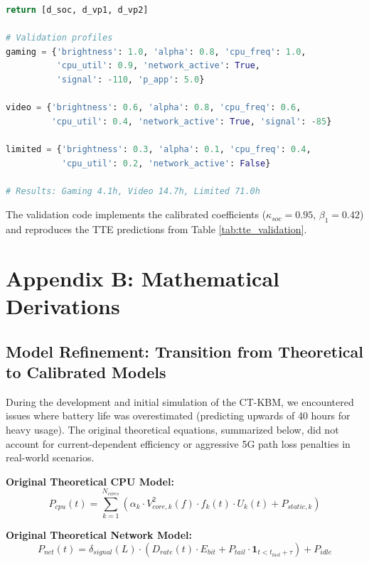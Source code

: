\documentclass[12pt]{article}
\begin{document}
\begin{lstlisting}[language=Python, caption={Validation with updated equations}]
    return [d_soc, d_vp1, d_vp2]

# Validation profiles
gaming = {'brightness': 1.0, 'alpha': 0.8, 'cpu_freq': 1.0,
          'cpu_util': 0.9, 'network_active': True,
          'signal': -110, 'p_app': 5.0}

video = {'brightness': 0.6, 'alpha': 0.8, 'cpu_freq': 0.6,
         'cpu_util': 0.4, 'network_active': True, 'signal': -85}

limited = {'brightness': 0.3, 'alpha': 0.1, 'cpu_freq': 0.4,
           'cpu_util': 0.2, 'network_active': False}

# Results: Gaming 4.1h, Video 14.7h, Limited 71.0h
\end{lstlisting}

The validation code implements the calibrated coefficients ($\kappa_{soc} = 0.95$, $\beta_1 = 0.42$) and reproduces the TTE predictions from Table \ref{tab:tte_validation}.


\newpage

\section{Appendix B: Mathematical Derivations}

\subsection*{Model Refinement: Transition from Theoretical to Calibrated Models}

During the development and initial simulation of the CT-KBM, we encountered issues where battery life was overestimated (predicting upwards of 40 hours for heavy usage). The original theoretical equations, summarized below, did not account for current-dependent efficiency or aggressive 5G path loss penalties in real-world scenarios.

\textbf{Original Theoretical CPU Model:}
\begin{equation} \label{eq:cpu_original}
P_{cpu}(t) = \sum_{k=1}^{N_{cores}} \left( \alpha_k \cdot V_{core,k}^2(f) \cdot f_k(t) \cdot U_k(t) + P_{static,k} \right)
\end{equation}

\textbf{Original Theoretical Network Model:}
\begin{equation} \label{eq:net_original}
P_{net}(t) = \delta_{signal}(L) \cdot \left( D_{rate}(t) \cdot E_{bit} + P_{tail} \cdot \mathbf{1}_{t < t_{last} + \tau} \right) + P_{idle}
\end{equation}
\end{document}
